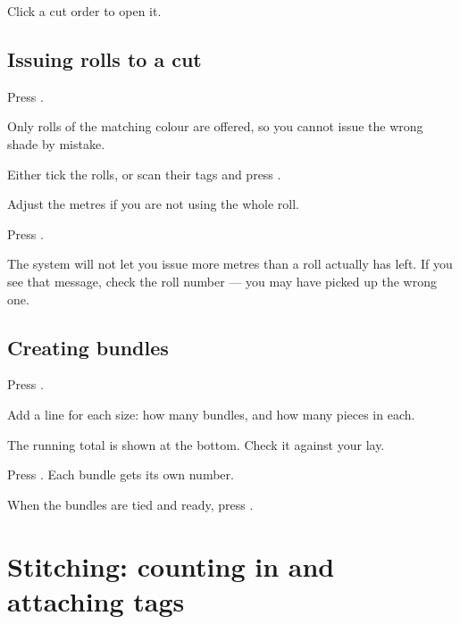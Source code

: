 Click a cut order to open it.


\subsection{Issuing rolls to a cut}

\begin{steps}
  \item Press .
  \item Only rolls of the matching colour are offered, so you cannot issue the
        wrong shade by mistake.
  \item Either tick the rolls, or scan their tags and press
        .
  \item Adjust the metres if you are not using the whole roll.
  \item Press .
\end{steps}

\begin{warnbox}
The system will not let you issue more metres than a roll actually has left. If
you see that message, check the roll number --- you may have picked up the wrong one.
\end{warnbox}

\subsection{Creating bundles}

\begin{steps}
  \item Press .
  \item Add a line for each size: how many bundles, and how many pieces in each.
  \item The running total is shown at the bottom. Check it against your lay.
  \item Press . Each bundle gets its own number.
\end{steps}

When the bundles are tied and ready, press .

\section{Stitching: counting in and attaching tags}

